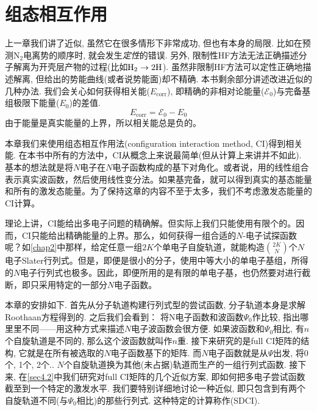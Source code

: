 \chapter{组态相互作用}
上一章我们讲了\hft 近似, 虽然它在很多情形下非常成功, 但也有本身的局限. \hft 比如在预测$\text{N}_2$电离势的顺序时, 就会发生\emph{定性}的错误. 另外, 限制性HF方法无法正确描述分子解离为开壳层产物的过程(比如$\mathrm{H}_2\to2\text{H}$). 虽然非限制HF方法可以定性正确地描述解离, 但给出的势能曲线(或者说势能面)却不精确. 本书剩余部分讲述改进\hft 近似的几种办法. 我们会关心如何获得相关能($E_\mathrm{corr}$), 即精确的非相对论能量($\mathscr{E}_0$)与完备基组极限下\hft 能量($E_0$)的差值.
\begin{equation}
E_\mathrm{corr}=\mathscr{E}_0-E_0
\end{equation}
由于\hft 能量是真实能量的上界，所以相关能总是负的。

本章我们来使用组态相互作用法(configuration interaction method, CI)得到相关能. 在本书中所有的方法中，CI从概念上来说最简单(但从计算上来讲并不如此). 基本的想法就是将$N$电子\ha 在$N$电子函数构成的基下对角化。或者说，用的线性组合表示真实波函数，然后使用线性变分法。如果基完备，就可以得到真实的基态能量和所有的激发态能量。为了保持这章的内容不至于太多，我们不考虑激发态能量的CI计算。


理论上讲，CI能给出多电子问题的精确解。但实际上我们只能使用有限个的。因而，CI只能给出精确能量的上界。那么，如何获得一组合适的$N$-电子试探函数呢？如\ref{chap2}中那样，给定任意一组$2K$个单电子自旋轨道，就能构造$\binom{2K}{N}$个$N$电子Slater行列式。但是，即便是很小的分子，使用中等大小的单电子基组，所得的$N$电子行列式也极多。因此，即便所用的是有限的单电子基，也仍然要对进行截断，即只采用特定的一部分$N$电子函数。


本章的安排如下. 首先从\hft 分子轨道构建行列式型的尝试函数, 分子轨道本身是求解Roothaan方程得到的. 之后我们会看到： 将N电子函数和\hft 波函数$\Psi_0$作比较, 指出哪里里不同——用这种方式来描述$N$电子波函数会很方便. 如果波函数和$\Psi_0$相比, 有$n$个自旋轨道是不同的, 那么这个波函数就叫作$n$重. 接下来研究的是full CI矩阵的结构, 它就是\ha 在所有被选取的$N$电子函数基下的矩阵. 而$N$电子函数就是从$\Psi$出发, 将0个, 1个, 2个.. $N$个自旋轨道换为其他(未占据)轨道而生产的一组行列式函数. 接下来, 在\ref{sec4.2}中我们研究对full CI矩阵的几个近似方案, 即如何把多电子尝试函数截至到一个特定的激发水平. 我们要特别详细地讨论一种近似, 即只包含到有两个自旋轨道不同(与$\Psi_0$相比)的那些行列式. 这种特定的计算称作(SDCI).

